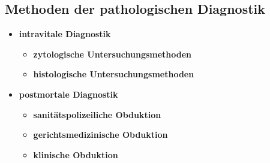 \subsection{Methoden der pathologischen Diagnostik}
	\begin{itemize}
		\item \textbf{intravitale Diagnostik}
			\begin{itemize}
				\item \textbf{zytologische Untersuchungsmethoden}
				\item \textbf{histologische Untersuchungsmethoden}
			\end{itemize}
		\item \textbf{postmortale Diagnostik}
			\begin{itemize}
				\item \textbf{sanitätspolizeiliche Obduktion}
				\item \textbf{gerichtsmedizinische Obduktion}
				\item \textbf{klinische Obduktion}
			\end{itemize}
	\end{itemize}

